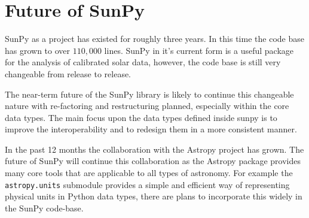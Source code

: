 \section{Future of SunPy}
SunPy as a project has existed for roughly three years. In this time the code 
base has grown to over $110,000$ lines. SunPy in it's current form is a useful 
package for the analysis of calibrated solar data, however, the code base is 
still very changeable from release to release.

The near-term future of the SunPy library is likely to continue this changeable 
nature with re-factoring and restructuring planned, especially within the 
core data types. The main focus upon the data types defined inside sunpy is to 
improve the interoperability and to redesign them in a more consistent manner.

In the past 12 months the collaboration with the Astropy project 
\cite{theastropycollaboration2013} has grown. The future of SunPy 
will continue this collaboration as the Astropy package provides many core 
tools that are applicable to all types of astronomy. For example the 
\texttt{astropy.units} submodule provides a simple and efficient way of 
representing physical units in Python data types, there are plans to 
incorporate this widely in the SunPy code-base.
